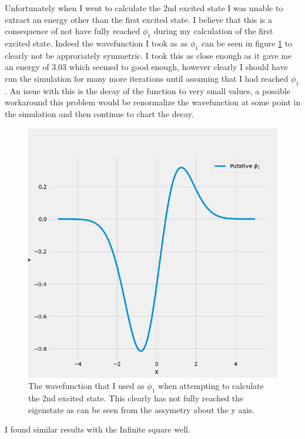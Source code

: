 \documentclass[]{article}
\begin{document}
Unfortunately when I went to calculate the 2nd excited state I was unable to extract an energy other than the first excited state. I believe that this is a consequence of not have fully reached $\phi_1$ during my calculation of the first excited state. Indeed the wavefunction I took as as $\phi_1$ can be seen in figure \ref{fig:phi1} to clearly not be approriately symmetric. I took this as close enough as it gave me an energy of 3.03 which seemed to good enough, however clearly I should have run the simulation for many more iterations until assuming that I had reached $\phi_1$. An issue with this is the decay of the function to very small values, a possible workaround this problem would be renormalize the wavefunction at some point in the simulation and then continue to chart the decay. 
\begin{figure}
	\centering
	\includegraphics[width=.8\textwidth]{figures/phi1.png}
	\caption{The wavefunction that I used as $\phi_1$ when attempting to calculate the 2nd excited state. This clearly has not fully reached the eigenstate as can be seen from the assymetry about the y axis.}
	\label{fig:phi1}
\end{figure}


I found similar results with the Infinite square well.
\end{document}
